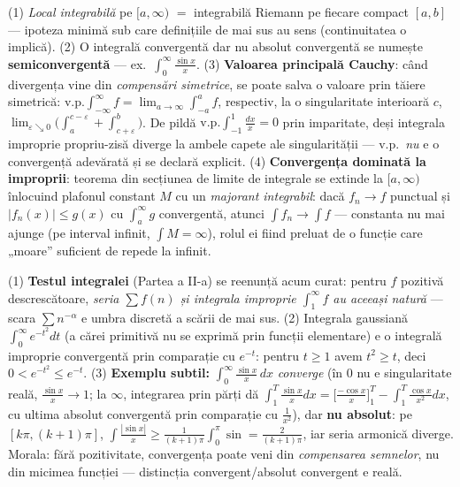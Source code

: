 \begin{obs}
(1) \emph{Local integrabilă} pe $[a,\infty)$ $=$ integrabilă Riemann pe fiecare compact $[a,b]$ --- ipoteza minimă sub care definițiile de mai sus au sens (continuitatea o implică). (2) O integrală convergentă dar nu absolut convergentă se numește \textbf{semiconvergentă} --- ex.\ $\int_0^\infty\frac{\sin x}{x}$. (3) \textbf{Valoarea principală Cauchy}: când divergența vine din \emph{compensări simetrice}, se poate salva o valoare prin tăiere simetrică: $\mathrm{v.p.}\int_{-\infty}^{\infty}f=\lim_{a\to\infty}\int_{-a}^{a}f$, respectiv, la o singularitate interioară $c$, $\lim_{\varepsilon\searrow0}\big(\int_a^{c-\varepsilon}+\int_{c+\varepsilon}^b\big)$. De pildă $\mathrm{v.p.}\int_{-1}^{1}\frac{dx}{x}=0$ prin imparitate, deși integrala improprie propriu-zisă diverge la ambele capete ale singularității --- v.p.\ \emph{nu} e o convergență adevărată și se declară explicit. (4) \textbf{Convergența dominată la improprii}: teorema din secțiunea de limite de integrale se extinde la $[a,\infty)$ înlocuind plafonul constant $M$ cu un \emph{majorant integrabil}: dacă $f_n\to f$ punctual și $|f_n(x)|\le g(x)$ cu $\int_a^\infty g$ convergentă, atunci $\int f_n\to\int f$ --- constanta nu mai ajunge (pe interval infinit, $\int M=\infty$), rolul ei fiind preluat de o funcție care „moare'' suficient de repede la infinit.
\end{obs}

\begin{obs}
(1) \textbf{Testul integralei} (Partea a II-a) se reenunță acum curat: pentru $f$ pozitivă descrescătoare, \emph{seria $\sum f(n)$ și integrala improprie $\int_1^\infty f$ au aceeași natură} --- scara $\sum n^{-\alpha}$ e umbra discretă a scării de mai sus. (2) Integrala gaussiană $\int_0^\infty e^{-t^2}dt$ (a cărei primitivă nu se exprimă prin funcții elementare) e o integrală improprie convergentă prin comparație cu $e^{-t}$: pentru $t\ge1$ avem $t^2\ge t$, deci $0<e^{-t^2}\le e^{-t}$. (3) \textbf{Exemplu subtil:} $\displaystyle\int_0^{\infty}\frac{\sin x}{x}\,dx$ \emph{converge} (în $0$ nu e singularitate reală, $\frac{\sin x}x\to1$; la $\infty$, integrarea prin părți dă $\int_1^T\frac{\sin x}{x}dx=\big[\frac{-\cos x}{x}\big]_1^T-\int_1^T\frac{\cos x}{x^2}dx$, cu ultima absolut convergentă prin comparație cu $\frac1{x^2}$), dar \textbf{nu absolut}: pe $[k\pi,(k+1)\pi]$, $\int\frac{|\sin x|}{x}\ge\frac{1}{(k+1)\pi}\int_0^\pi\sin=\frac{2}{(k+1)\pi}$, iar seria armonică diverge. Morala: fără pozitivitate, convergența poate veni din \emph{compensarea semnelor}, nu din micimea funcției --- distincția convergent/absolut convergent e reală.
\end{obs}

